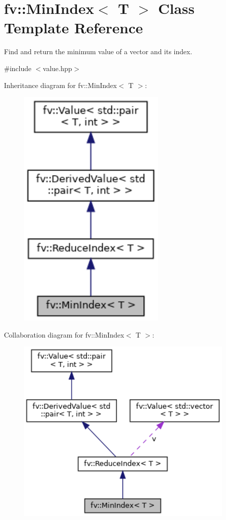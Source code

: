 \hypertarget{classfv_1_1MinIndex}{}\section{fv\+:\+:Min\+Index$<$ T $>$ Class Template Reference}
\label{classfv_1_1MinIndex}


Find and return the minimum value of a vector and its index.  




{\ttfamily \#include $<$value.\+hpp$>$}



Inheritance diagram for fv\+:\+:Min\+Index$<$ T $>$\+:
\nopagebreak
\begin{figure}[H]
\begin{center}
\leavevmode
\includegraphics[width=203pt]{classfv_1_1MinIndex__inherit__graph}
\end{center}
\end{figure}


Collaboration diagram for fv\+:\+:Min\+Index$<$ T $>$\+:
\nopagebreak
\begin{figure}[H]
\begin{center}
\leavevmode
\includegraphics[width=300pt]{classfv_1_1MinIndex__coll__graph}
\end{center}
\end{figure}
